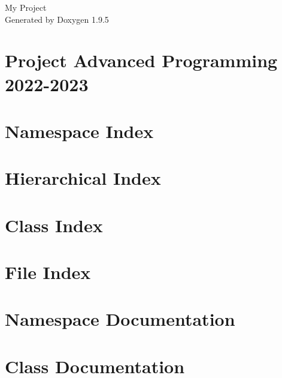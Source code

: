 \documentclass[twoside]{book}
\newcommand{\+}{\discretionary{\mbox{\scriptsize$\hookleftarrow$}}{}{}}
\newcommand{\clearemptydoublepage}{%
    \newpage{\pagestyle{empty}\cleardoublepage}%
  }
\begin{document}
  \raggedbottom
    \hypersetup{pageanchor=false,
                bookmarksnumbered=true,
                pdfencoding=unicode
               }
  \begin{titlepage}
  \vspace*{7cm}
  \begin{center}%
  {\Large My Project}\\
  \vspace*{1cm}
  {\large Generated by Doxygen 1.9.5}\\
  \end{center}
  \end{titlepage}
  \clearemptydoublepage
  \tableofcontents
  \clearemptydoublepage
  \hypersetup{pageanchor=true}
\chapter{Project Advanced Programming 2022-\/2023}
\label{index}\hypertarget{index}{}
\chapter{Namespace Index}

\chapter{Hierarchical Index}

\chapter{Class Index}

\chapter{File Index}

\chapter{Namespace Documentation}



\chapter{Class Documentation}

























\end{document}
